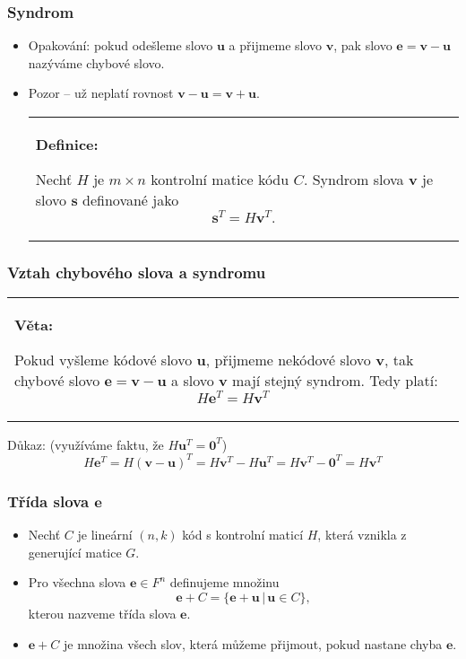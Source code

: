 \documentclass{beamer}
\newenvironment{definice}
{
    \begin{center}
    \begin{tabular}{p{9cm}}
    \textbf{Definice:}
}
{
    \end{tabular}
    \end{center}
}
\newenvironment{veta}
{
    \begin{center}
    \begin{tabular}{p{9cm}}
    \textbf{Věta:}
}
{
    \end{tabular}
    \end{center}
}
\newcommand{\sep}{\,|\,}
\newcommand{\vu}{\textbf{u}}
\newcommand{\vv}{\textbf{v}}
\newcommand{\e}{\textbf{e}}
\newcommand{\s}{\textbf{s}}
\newcommand{\zero}{\textbf{0}}
\newenvironment{itemizex}%
  {\large \begin{itemize}%
    \setlength{\itemsep}{8pt}%
    \setlength{\parskip}{8pt}}%
  {\end{itemize}}
\begin{document}
\begin{frame}[t,fragile]\frametitle{Syndrom} 
    \begin{itemizex}
        \item Opakování: pokud odešleme slovo $\vu$ a přijmeme slovo $\vv$, pak slovo $\e=\vv-\vu$ nazýváme chybové slovo.
        \item Pozor -- už neplatí rovnost $\vv-\vu=\vv+\vu$.

        \begin{definice}
    Nechť $H$ je $m\times n$ kontrolní matice kódu $C$. Syndrom slova $\vv$ je slovo $\s$ definované jako 
    $$
\s^T=H\vv^T.
    $$\end{definice}

    \end{itemizex}
\end{frame}


\begin{frame}[t,fragile]\frametitle{Vztah chybového slova a syndromu} 
\begin{veta}
Pokud vyšleme kódové slovo $\vu$, přijmeme nekódové slovo $\vv$, tak chybové slovo $\e=\vv-\vu$ a slovo $\vv$ mají stejný syndrom. Tedy platí:
$$
H\e^T=H\vv^T
$$
\end{veta}

Důkaz: (využíváme faktu, že $H\vu^T=\zero^T$)
$$
H\e^T=H(\vv-\vu)^T=H\vv^T-H\vu^T=H\vv^T-\zero^T=H\vv^T
$$
\end{frame}



\begin{frame}[t,fragile]\frametitle{Třída slova $\e$} 
    \begin{itemizex}
        \item Nechť $C$ je lineární $(n,k)$ kód s kontrolní maticí $H$, která vznikla z generující matice $G$.
        \item Pro všechna slova $\e\in F^n$ definujeme množinu
        $$
        \e+C=\{\e+\vu\sep\vu\in C\},
        $$
        kterou nazveme třída slova $\e$.
        \item $\e+C$ je množina všech slov, která můžeme přijmout, pokud nastane chyba $\e$.
    \end{itemizex}
\end{frame}
\end{document}
